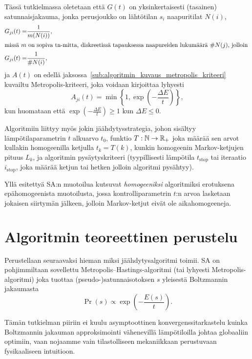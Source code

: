 Tässä tutkielmassa oletetaan että $G(t)$ on yksinkertaisesti (tasainen) satunnaisjakauma, jonka perusjoukko on lähtötilan $s_i$ naapuritilat $N(i)$,
\begin{align}
    G_{ji}(t) =& \frac{1}{m( N( i ) )}, \\
    \intertext{missä $m$ on sopiva tn-mitta, diskreetissä tapauksessa naapureiden lukumäärä $\#N(j)$, jolloin
    }
    G_{ji}(t) =& \frac{1}{\#N( i )},
\end{align}
ja $A(t)$ on edellä jaksossa~\ref{sub:algoritmin_kuvaus_metropolis_kriteeri} kuvailtu Metropolis-kriteeri, joka voidaan kirjoittaa lyhyesti
\begin{equation}
    \label{eq:metropolis_kriteeri}
    A_{ji}(t) = \min\left\{1, \exp\left(-\frac{\Delta E}{t}\right)\right\},
\end{equation}
kun huomataan että $\exp\left(-\frac{\Delta E}{t}\right) \geq 1$ kun $\Delta E \leq 0$.

Algoritmiin liittyy myös jokin jäähdytysstrategia,
johon sisältyy lämpötilaparametrin $t$ alkuarvo $t_0$,
funktio $T: \mathbb{N} \to \mathbb{R}_+$ joka määrää sen arvot kullakin homogeenilla ketjulla $t_{k} = T(k)$,
kunkin homogeenin Markov-ketjujen pituus $L_k$,
ja algoritmin pysäytyskriteeri (tyypillisesti lämpötila $t_\text{stop}$ tai iteraatio $i_\text{stop}$, joka määrää ketjun tai hetken jolloin algoritmi pysähtyy).

Yllä esitettyä SA:n muotoilua \textcite{laarhoven} kutsuvat \emph{homogeeniksi} algoritmiksi erotuksena epähomogeenista muotoilusta,
jossa kontrolliparametrin $t$:n arvoa lasketaan jokaisen siirtymän jälkeen, jolloin Markov-ketjut eivät ole aikahomogeeneja.


\section{Algoritmin teoreettinen perustelu}
\label{sec:algoritmin_teoreettinen_perustelu}

Perustellaan seuraavaksi hieman miksi jäähdytysalgoritmi toimii.
SA on pohjimmiltaan sovellettu Metropolis--Hastings-algoritmi (tai lyhyesti Metropolis-algoritmi) joka tuottaa (pseudo-)satunnaisotoksen $s$ yleisestä Boltzmannin jakaumasta
\begin{equation}
    \Pr\left( s \right) \propto \exp \left(-\frac{E(s)}{t}\right).
    \tag{Boltzmann}
    \label{eq:boltzmann_yleinen}
\end{equation}

Tämän tutkielman piiriin ei kuulu asymptoottinen konvergenssitarkastelu kuinka Boltzmannin jakauman approksimointi vähenevillä lämpötiloilla johtaa globaaliin optimiin,
vaan nojaamme vain tilastolliseen mekaniikkaan perustuvaan fysikaaliseen intuitioon.

